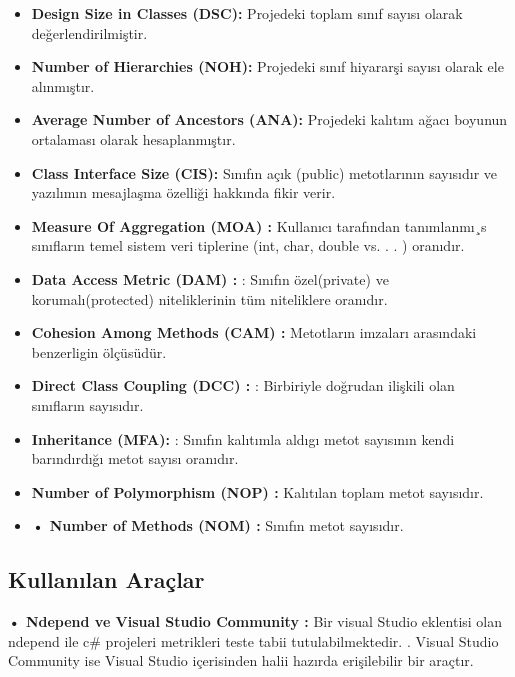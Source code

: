 \documentclass[conference]{IEEEtran}
\begin{document}
\begin{itemize}
	\item \textbf{Design Size in Classes (DSC):} Projedeki toplam sınıf sayısı olarak değerlendirilmiştir.
	\item \textbf{Number of Hierarchies (NOH):} Projedeki sınıf hiyararşi sayısı olarak ele alınmıştır.
	\item \textbf{Average Number of Ancestors (ANA):} Projedeki kalıtım ağacı boyunun ortalaması olarak hesaplanmıştır.
	\item \textbf{Class Interface Size (CIS):} Sınıfın açık (public)
metotlarının sayısıdır ve yazılımın mesajlaşma özelliği
hakkında fikir verir.

	\item \textbf{Measure Of Aggregation (MOA) :}  Kullanıcı tarafından tanımlanmı¸s sınıfların temel sistem veri tiplerine
(int, char, double vs. . . ) oranıdır.

	\item \textbf{Data Access Metric (DAM) :}  : Sınıfın özel(private)
ve korumalı(protected) niteliklerinin tüm niteliklere
oranıdır.

	\item \textbf{Cohesion Among Methods (CAM) :}  Metotların
imzaları arasındaki benzerligin ölçüsüdür.
	\item \textbf{Direct Class Coupling (DCC) :} : Birbiriyle doğrudan 
ilişkili olan sınıfların sayısıdır.
	\item \textbf{Inheritance (MFA):}  : Sınıfın kalıtımla aldıgı metot 
sayısının kendi barındırdığı metot sayısı oranıdır.
	\item \textbf{Number of Polymorphism (NOP) :}  Kalıtılan toplam
metot sayısıdır.

	\item \textbf{• Number of Methods (NOM) :}  Sınıfın metot sayısıdır.
\end{itemize}



\subsection{Kullanılan Araçlar}
\textbf{• Ndepend ve Visual Studio Community :} Bir visual Studio eklentisi olan ndepend ile c\# projeleri  metrikleri teste tabii tutulabilmektedir. \cite{label4}. Visual Studio Community ise Visual Studio içerisinden halii hazırda erişilebilir bir araçtır.
\end{document}
